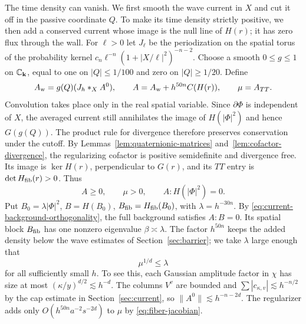 The time density can vanish. We first smooth the wave current in $X$
and cut it off in the passive coordinate $Q$. To make its time
density strictly positive, we then add a conserved current whose image
is the null line of $H(r)$; it has zero flux through the wall.
For $\ell>0$ let $J_\ell$ be the periodization on the spatial torus of
the probability kernel
$c_n\ell^{-n}(1+|X/\ell|^2)^{-n-2}$. Choose a smooth $0\le g\le1$ on
$\mathbb C_{\mathbf k}$, equal to one on $|Q|\le1/100$ and zero on
$|Q|\ge1/20$. Define
\begin{equation}\label{eq:regularized-current}
 A_{\rm w}=g(Q)(J_h*_X A^0),\qquad
 A=A_{\rm w}+h^{50n}C(H(r)),\qquad \mu=A_{TT}.
\end{equation}
Convolution takes place only in the real spatial variable. Since
$\partial\Phi$ is independent of $X$, the averaged current still
annihilates the image of $H(|\Phi|^2)$ and hence $G(g(Q))$. The product
rule for divergence therefore preserves conservation under the cutoff.
By Lemmas~\ref{lem:quaternionic-matrices} and~\ref{lem:cofactor-divergence},
the regularizing cofactor is positive semidefinite and divergence free.
Its image is $\ker H(r)$, perpendicular to $G(r)$, and its $TT$ entry
is $\det H_{\rm fib}(r)>0$. Thus
\begin{equation}\label{eq:current-background-orthogonality}
 A\ge0,\qquad \mu>0,\qquad A:H(|\Phi|^2)=0 .
\end{equation}
Put $B_0=\lambda|\Phi|^2$, $B=H(B_0)$, $B_{\rm fib}=H_{\rm fib}(B_0)$,
with $\lambda=h^{-30n}$. By \eqref{eq:current-background-orthogonality},
the full background satisfies $A:B=0$. Its spatial block $B_{\rm fib}$
has one nonzero eigenvalue $\beta\asymp\lambda$. The factor
$h^{50n}$ keeps the added density below the wave estimates
of Section~\ref{sec:barrier}; we take $\lambda$ large enough that
\begin{equation}\label{eq:energy-density-ceiling}
 \mu^{1/d}\le\lambda
\end{equation}
for all sufficiently small $h$. To see this, each Gaussian amplitude
factor in $\chi$ has size at most $(\kappa/y)^{d/2}\lesssim h^{-d}$.
The columns $V^v$ are bounded and $\sum|c_{\kappa,v}|\lesssim h^{-n/2}$
by the cap estimate in Section~\ref{sec:current}, so
$\|A^0\|\lesssim h^{-n-2d}$. The regularizer adds only
$O(h^{50n}a^{-2}s^{-2d})$ to $\mu$ by \eqref{eq:fiber-jacobian}.

